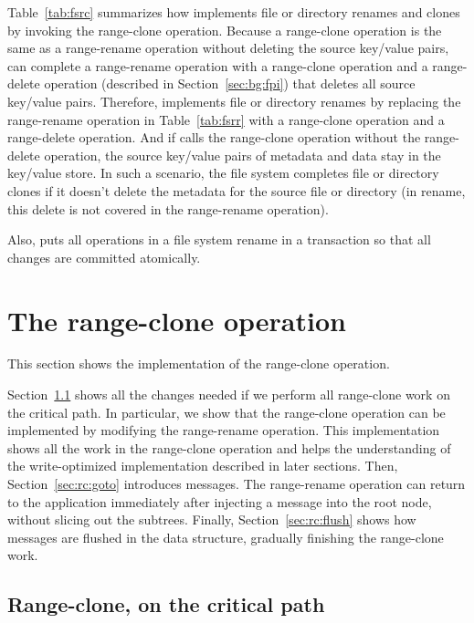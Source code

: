 Table~\ref{tab:fsrc} summarizes how \betrfs implements file or
directory renames and clones by invoking the range-clone operation.
Because a range-clone operation is the same as a range-rename operation without
deleting the source key/value pairs,
\betrfs can complete a range-rename operation with a range-clone operation and
a range-delete operation (described in Section~\ref{sec:bg:fpi})
that deletes all source key/value pairs.
Therefore, \betrfs implements file or directory renames
by replacing the range-rename operation in Table~\ref{tab:fsrr} with
a range-clone operation and a range-delete operation.
And if \betrfs calls the range-clone operation without the range-delete
operation,
the source key/value pairs of metadata and data stay in the key/value store.
In such a scenario, the file system completes file or directory clones if it
doesn't delete the metadata for the source file or directory
(in rename, this delete is not covered in the range-rename operation).

Also, \betrfs puts all operations in a file system rename in a transaction
so that all changes are committed atomically.

\section{The range-clone operation}
\label{sec:rc:rc}

This section shows the implementation of the range-clone operation.

Section~\ref{sec:rc:crit} shows all the changes needed if we perform all
range-clone work on the critical path.
In particular, we show that the range-clone operation can be implemented
by modifying the range-rename operation.
This implementation shows all the work in the range-clone operation and
helps the understanding of the write-optimized implementation described in
later sections.
Then, Section~\ref{sec:rc:goto} introduces \goto messages.
The range-rename operation can return to the application immediately
after injecting a \goto message into the root node,
without slicing out the subtrees.
Finally, Section~\ref{sec:rc:flush} shows how \goto messages are flushed in
the data structure, gradually finishing the range-clone work.

\subsection{Range-clone, on the critical path}
\label{sec:rc:crit}

